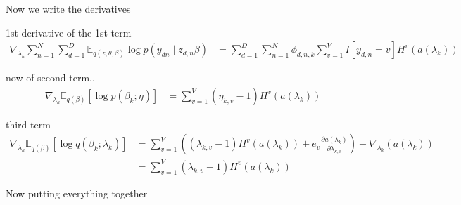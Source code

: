 \documentclass [12pt]{article}
\newcommand{\E}{\ensuremath{\mathbb{E}}}
\begin{document}
\begin{itemize}
Now we write the derivatives 

1st derivative of the 1st term
\begin{align*}
    \nabla_{\lambda_{k}} \sum_{n=1}^N \sum_{d=1}^D \E_{q(z, \theta, \beta)}{ \log p(y_{dn} \mid z_{d,n} \beta)} &=  \sum_{d=1}^D \sum_{n=1}^N \phi_{d,n,k} \sum_{v=1}^V I[y_{d,n} = v]  H^v(a(\lambda_k) )
\end{align*}

now of second term..
\begin{align*}
    \nabla_{\lambda_{k}} \E_{q(\beta)} \left[\log p(\beta_k ; \eta)\right] &= \sum_{v=1}^V (\eta_{k,v} -1) H^{v} (a(\lambda_k))
\end{align*}

third term
\begin{align*}
    \nabla_{\lambda_{k}} \E_{q(\beta)} \left[\log q(\beta_k ; \lambda_k)\right] &= \sum_{v=1}^V \left((\lambda_{k,v} -1) H^{v}(a(\lambda_k)) + e_v\frac{\partial a(\lambda_k)}{\partial \lambda_{k,v}} \right) - \nabla_{\lambda_k} (a(\lambda_k)) \\
    &= \sum_{v=1}^V (\lambda_{k,v} -1) H^{v}(a(\lambda_k))
\end{align*}

Now putting everything together


\end{itemize}
\end{document}
